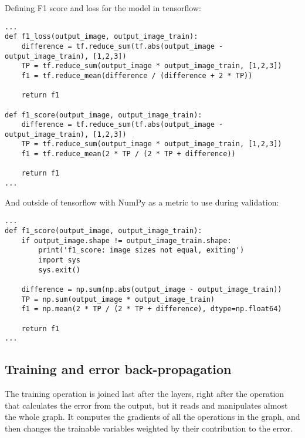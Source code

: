 \documentclass[12pt]{report}
\begin{document}
Defining F1 score and loss for the model in tensorflow:
\begin{center}
	\begin{minipage}{0.95\textwidth}
		\begin{lstlisting}[title=fcn\_model.py]
...
def f1_loss(output_image, output_image_train):
	difference = tf.reduce_sum(tf.abs(output_image - output_image_train), [1,2,3])
	TP = tf.reduce_sum(output_image * output_image_train, [1,2,3])
	f1 = tf.reduce_mean(difference / (difference + 2 * TP))

	return f1

def f1_score(output_image, output_image_train):
	difference = tf.reduce_sum(tf.abs(output_image - output_image_train), [1,2,3])
	TP = tf.reduce_sum(output_image * output_image_train, [1,2,3])
	f1 = tf.reduce_mean(2 * TP / (2 * TP + difference))

	return f1
...
		\end{lstlisting}
	\end{minipage}
\end{center}
And outside of tensorflow with NumPy as a metric to use during validation:
\begin{center}
	\begin{minipage}{0.95\textwidth}
		\begin{lstlisting}[title=metrics.py]
...
def f1_score(output_image, output_image_train):
	if output_image.shape != output_image_train.shape:
		print('f1_score: image sizes not equal, exiting')
		import sys
		sys.exit()

	difference = np.sum(np.abs(output_image - output_image_train))
	TP = np.sum(output_image * output_image_train)
	f1 = np.mean(2 * TP / (2 * TP + difference), dtype=np.float64)

	return f1
...
		\end{lstlisting}
	\end{minipage}
\end{center}

\subsection{Training and error back-propagation} \label{train}
The training operation is joined last after the layers, right after the operation that calculates the error from the output, but it reads and manipulates almost the whole graph. It computes the gradients of all the operations in the graph, and then changes the trainable variables weighted by their contribution to the error.
\end{document}
